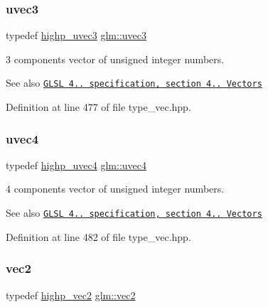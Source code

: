 \subsubsection{\texorpdfstring{uvec3}{uvec3}}
{\footnotesize\ttfamily typedef \hyperlink{group__core__precision_ga66d0e4ae1742ede2eb32bf0bfedd7474}{highp\+\_\+uvec3} \hyperlink{group__core__types_gac4ba593917841b859ba1683b8b52b8fa}{glm\+::uvec3}}

3 components vector of unsigned integer numbers.

\begin{DoxySeeAlso}{See also}
\href{http://www.opengl.org/registry/doc/GLSLangSpec.4.20.8.pdf}{\tt G\+L\+SL 4.. specification, section 4.. Vectors} 
\end{DoxySeeAlso}


Definition at line 477 of file type\+\_\+vec.\+hpp.

\mbox{\label{group__core__types_ga1c426d19627b32b14f0089f7f4ba7b1d}} 
\subsubsection{\texorpdfstring{uvec4}{uvec4}}
{\footnotesize\ttfamily typedef \hyperlink{group__core__precision_ga7cb8cc501f7e680e1889b93eb80e6c46}{highp\+\_\+uvec4} \hyperlink{group__core__types_ga1c426d19627b32b14f0089f7f4ba7b1d}{glm\+::uvec4}}

4 components vector of unsigned integer numbers.

\begin{DoxySeeAlso}{See also}
\href{http://www.opengl.org/registry/doc/GLSLangSpec.4.20.8.pdf}{\tt G\+L\+SL 4.. specification, section 4.. Vectors} 
\end{DoxySeeAlso}


Definition at line 482 of file type\+\_\+vec.\+hpp.

\mbox{\label{group__core__types_gaa1618f51db67eaa145db101d8c8431d8}} 
\subsubsection{\texorpdfstring{vec2}{vec2}}
{\footnotesize\ttfamily typedef \hyperlink{group__core__precision_ga37645abcfcc1278567e99f1ca492bfbb}{highp\+\_\+vec2} \hyperlink{group__core__types_gaa1618f51db67eaa145db101d8c8431d8}{glm\+::vec2}}


